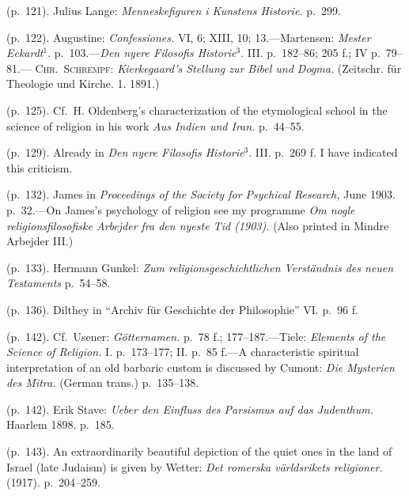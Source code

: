 \documentclass[12pt,a4paper]{book}
\newcommand{\opage}[1]{\marginnote{\footnotesize\textit{[#1]}}}
\begin{document}
 (p.~121). Julius Lange: \emph{Menneskefiguren i Kunstens Historie.} p.~299.

 (p.~122). Augustine: \emph{Confessiones.} VI, 6; XIII, 10; 13.---Martensen: \emph{Mester Eckardt}$^1$.
p.~103.---\emph{Den nyere Filosofis Historie}$^3$. 
\opage{252}III. p.~182--86; 205 f.; IV p.~79--81.---%
\textsc{Chr.\ Schrempf}: \emph{Kierkegaard's Stellung zur Bibel und Dogma.} (Zeitschr. für Theologie
und Kirche. 1. 1891.)

 (p.~125). Cf.\ H. Oldenberg's characterization of the etymological school in the science of religion
in his work \emph{Aus Indien und Iran.} p.~44--55.

 (p.~129). Already in \emph{Den nyere Filosofis Historie}$^3$. III. p.~269 f. I have indicated this
criticism.

 (p.~132). James in \emph{Proceedings of the Society for Psychical Research,} June 1903. p.~32.---On
James's psychology of religion see my programme \emph{Om nogle religionsfilosofiske Arbejder fra den
nyeste Tid (1903).} (Also printed in Mindre Arbejder III.)

 (p.~133). Hermann Gunkel: \emph{Zum religionsgeschichtlichen Verständnis des neuen Testaments}
p.~54--58.

 (p.~136). Dilthey in ``Archiv für Geschichte der Philosophie'' VI. p.~96 f.

 (p.~142). Cf.\ Usener: \emph{Götternamen.} p.~78 f.; 177--187.---Tiele: \emph{Elements of the Science
of Religion.} I. p.~173--177; II. p.~85 f.---A characteristic spiritual interpretation of an old
barbaric custom is discussed by Cumont: \emph{Die Mysterien des Mitra.} (German trans.) p.~135--138.

 (p.~142). Erik Stave: \emph{Ueber den Einfluss des Parsismus auf das Judenthum.} Haarlem 1898. p.~185.

 (p.~143). An extraordinarily beautiful depiction of the quiet ones in the land of Israel (late Judaism)
is given by Wetter: \emph{Det romerska världsrikets religioner.} (1917). p.~204--259.
\end{document}
